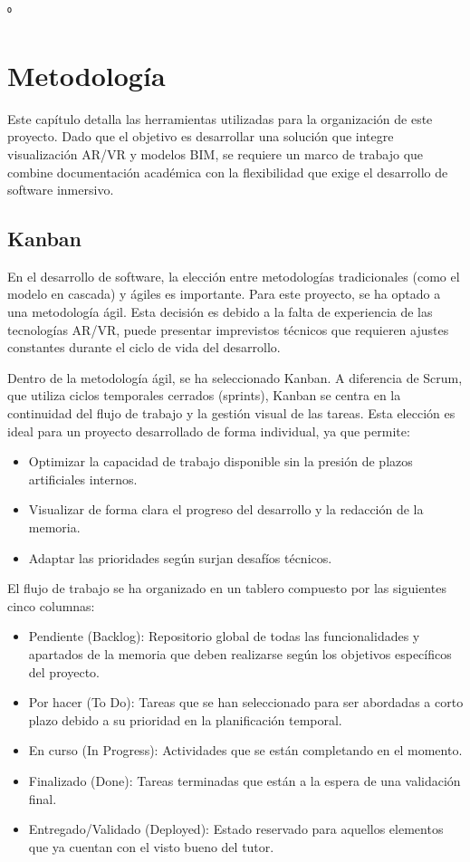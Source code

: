 ⁰
\chapter{\label{metodologia}Metodología}

Este capítulo detalla las herramientas utilizadas para la organización de este proyecto. Dado que el objetivo es desarrollar una solución que integre visualización AR/VR y modelos BIM, se requiere un marco de trabajo que combine documentación académica con la flexibilidad que exige el desarrollo de software inmersivo.
\section{Kanban}

En el desarrollo de software, la elección entre metodologías tradicionales (como el modelo en cascada) y ágiles es importante. Para este proyecto, se ha optado a una metodología ágil. Esta decisión es debido a la falta de experiencia de las tecnologías AR/VR, puede presentar imprevistos técnicos que requieren ajustes constantes durante el ciclo de vida del desarrollo.

Dentro de la metodología ágil, se ha seleccionado Kanban. A diferencia de Scrum, que utiliza ciclos temporales cerrados (sprints), Kanban se centra en la continuidad del flujo de trabajo y la gestión visual de las tareas. Esta elección es ideal para un proyecto desarrollado de forma individual, ya que permite:
\begin{itemize}
\item Optimizar la capacidad de trabajo disponible sin la presión de plazos artificiales internos.

\item Visualizar de forma clara el progreso del desarrollo y la redacción de la memoria.

\item Adaptar las prioridades según surjan desafíos técnicos.
\end{itemize}

El flujo de trabajo se ha organizado en un tablero compuesto por las siguientes cinco columnas:
\begin{itemize}
\item Pendiente (Backlog): Repositorio global de todas las funcionalidades y apartados de la memoria que deben realizarse según los objetivos específicos del proyecto.

\item Por hacer (To Do): Tareas que se han seleccionado para ser abordadas a corto plazo debido a su prioridad en la planificación temporal.

\item En curso (In Progress): Actividades que se están completando en el momento.

\item Finalizado (Done): Tareas terminadas que están a la espera de una validación final.

\item Entregado/Validado (Deployed): Estado reservado para aquellos elementos que ya cuentan con el visto bueno del tutor.
\end{itemize}
